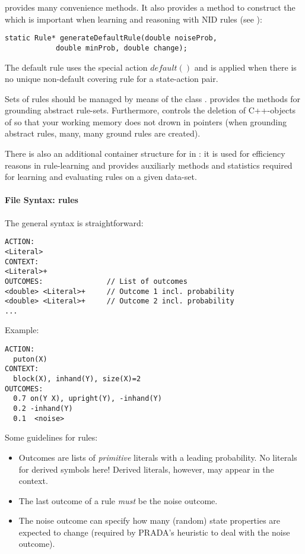 \documentclass[10pt,twoside,twocolumn,fleqn]{article}
\begin{document}
 provides many convenience methods. It also provides a method
to construct the  which is important when
learning and reasoning with NID rules (see \cite{pasula07ai}):
\begin{lstlisting}
static Rule* generateDefaultRule(double noiseProb,
			double minProb, double change);
\end{lstlisting}
The default rule uses the special action $default()$ and is applied when
there is no unique non-default covering rule for a state-action pair.

Sets of rules should be managed by means of the class .
 provides the methods for grounding abstract rule-sets.
Furthermore,  controls the  deletion  of C++-objects of
 so that your working memory does not drown in 
pointers (when grounding abstract rules, many, many ground rules are
created).

There is also an additional container structure  for
 in : it is used
for efficiency reasons in rule-learning and provides auxiliarly methods
and statistics required for learning and evaluating rules on a given
data-set.


\paragraph{File Syntax: rules}

The general syntax is straightforward:
\begin{lstlisting}
ACTION:
<Literal>
CONTEXT:
<Literal>+
OUTCOMES:               // List of outcomes
<double> <Literal>+     // Outcome 1 incl. probability
<double> <Literal>+     // Outcome 2 incl. probability
...
\end{lstlisting}

Example:
\begin{lstlisting}
ACTION:
  puton(X)
CONTEXT:
  block(X), inhand(Y), size(X)=2
OUTCOMES:
  0.7 on(Y X), upright(Y), -inhand(Y)
  0.2 -inhand(Y)
  0.1  <noise>
\end{lstlisting}

Some guidelines for rules:
\begin{itemize}
\item Outcomes are lists of \emph{primitive} literals with a leading
probability. No literals for derived symbols here! Derived literals,
however, may appear in the context.
\item The last outcome of a rule \emph{must} be the noise outcome.
\item The noise outcome can specify how many (random) state properties
are expected to change (required by PRADA's heuristic to deal with the noise
outcome).
\end{itemize}
\end{document}

